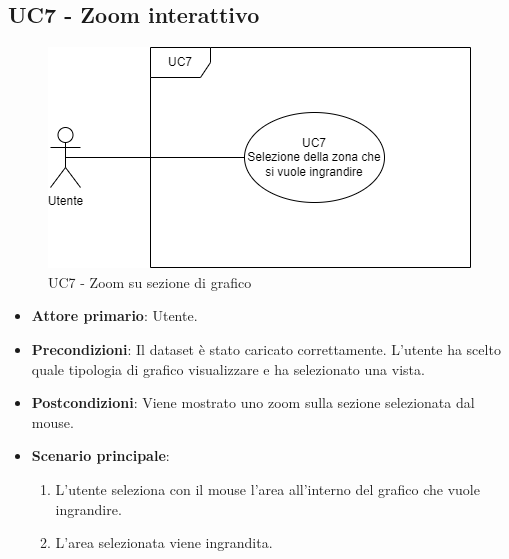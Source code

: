 \subsection{UC7 - Zoom interattivo}
\label{sec:UC7}
\begin{figure}[h!]
    \centering
    \includegraphics[scale=0.55]{../../assets/zoom_interattivo.png}
    \caption{UC7 - Zoom su sezione di grafico}
\end{figure}
\begin{itemize}
    \item \textbf{Attore primario}: Utente.
    \item \textbf{Precondizioni}: Il dataset è stato caricato correttamente. L'utente ha scelto quale tipologia di grafico visualizzare e ha selezionato una vista.
    \item \textbf{Postcondizioni}: Viene mostrato uno zoom sulla sezione selezionata dal mouse.
    \item \textbf{Scenario principale}:
          \begin{enumerate}
              \item L'utente seleziona con il mouse l'area all'interno del grafico che vuole ingrandire.
              \item L'area selezionata viene ingrandita.
          \end{enumerate}
\end{itemize}

\newpage


